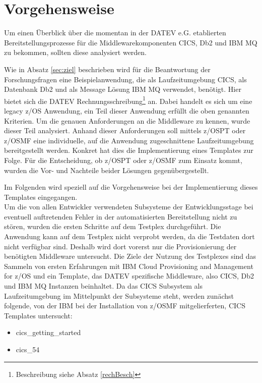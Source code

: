 \chapter{Vorgehensweise}\label{ch:vorgehensweise}
Um einen Überblick über die momentan in der DATEV e.G. etablierten Bereitstellungsprozesse für die Middlewarekomponenten CICS, Db2 und IBM MQ zu bekommen, sollten diese analysiert werden.

Wie in Absatz \ref{sec:ziel} beschrieben wird für die Beantwortung der Forschungsfragen eine Beispielanwendung, die als Laufzeitumgebung CICS, als Datenbank Db2 und als Message Lösung IBM MQ verwendet, benötigt.
Hier bietet sich die \glqq DATEV Rechnungsschreibung\grqq{}\footnote{Beschreibung siehe Absatz \ref{rechBesch}} an.
Dabei handelt es sich um eine legacy z/OS Anwendung, ein Teil dieser Anwendung erfüllt die oben genannten Kriterien.
Um die genauen Anforderungen an die Middleware zu kennen, wurde dieser Teil analysiert.
Anhand dieser Anforderungen soll mittels z/OSPT oder z/OSMF eine individuelle, auf die Anwendung zugeschnittene Laufzeitumgebung bereitgestellt werden.
Konkret hat dies die Implementierung eines Templates zur Folge.
Für die Entscheidung, ob z/OSPT oder z/OSMF zum Einsatz kommt, wurden die Vor- und Nachteile beider Lösungen gegenübergestellt.

Im Folgenden wird speziell auf die Vorgehensweise bei der Implementierung dieses Templates eingegangen.\\
Um die von allen Entwickler verwendeten Subsysteme der Entwicklungsstage bei eventuell auftretenden Fehler in der automatisierten Bereitstellung nicht zu stören, wurden die ersten Schritte auf dem Testplex durchgeführt.
Die Anwendung kann auf dem Testplex nicht verprobt werden, da die Testdaten dort nicht verfügbar sind.
Deshalb wird dort vorerst nur die Provisionierung der benötigten Middleware untersucht.
Die Ziele der Nutzung des Testplexes sind das Sammeln von ersten Erfahrungen mit \glqq IBM Cloud Provisioning and Management for z/OS\grqq{} und ein Template, das DATEV spezifische Middleware, also CICS, Db2 und IBM MQ Instanzen beinhaltet.
Da das CICS Subsystem als Laufzeitumgebung im Mittelpunkt der Subsysteme steht, werden zunächst folgende, von der IBM bei der Installation von z/OSMF mitgelierferten, CICS Templates untersucht:
\begin{itemize}
\item \glqq cics\_getting\_started\grqq
\item \glqq cics\_54\grqq
\end{itemize}

